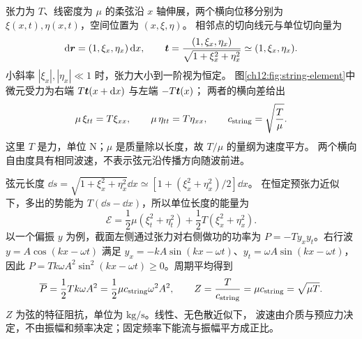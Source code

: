 张力为 $T$、线密度为 $\mu$ 的柔弦沿 $x$ 轴伸展，两个横向位移分别为
$\xi(x,t),\eta(x,t)$，空间位置为 $(x,\xi,\eta)$。
相邻点的切向线元与单位切向量为
\[
 \mathop{}\!\mathrm d\bm{r}=(1,\xi_x,\eta_x)\mathop{}\!\mathrm d x,\qquad
 \bm{t}=\frac{(1,\xi_x,\eta_x)}{\sqrt{1+\xi_x^2+\eta_x^2}}
 \simeq(1,\xi_x,\eta_x).
\]
小斜率 $|\xi_x|,|\eta_x|\ll1$ 时，张力大小到一阶视为恒定。
图\ref{ch12:fig:string-element}中微元受力为右端 $T\bm{t}(x+\mathop{}\!\mathrm d x)$ 与左端 $-T\bm{t}(x)$；
两者的横向差给出
\begin{equation}
 \mu\,\xi_{tt}=T\xi_{xx},\qquad
 \mu\,\eta_{tt}=T\eta_{xx},\qquad c_{\rm string}=\sqrt{\frac T\mu}.
 \label{ch12:eq:string-wave}
\end{equation}
这里 $T$ 是力，单位 $\mathrm N$；$\mu$ 是质量除以长度，故 $T/\mu$ 的量纲为速度平方。
两个横向自由度具有相同波速，不表示弦元沿传播方向随波前进。

\begin{center}\begin{minipage}{\linewidth}\centering
{}
\label{ch12:fig:string-element}
\end{minipage}\end{center}

弦元长度
$\dd s=\sqrt{1+\xi_x^2+\eta_x^2}\dd x
\simeq[1+(\xi_x^2+\eta_x^2)/2]\dd x$。
在恒定预张力近似下，多出的势能为 $T(\dd s-\dd x)$，所以单位长度的能量为
\begin{equation}
 \mathcal E=\frac12\mu(\xi_t^2+\eta_t^2)+\frac12T(\xi_x^2+\eta_x^2).
 \label{ch12:eq:string-energy}
\end{equation}
以一个偏振 $y$ 为例，截面左侧通过张力对右侧做功的功率为
$P=-Ty_xy_t$。右行波 $y=A\cos(kx-\omega t)$ 满足
$y_x=-kA\sin(kx-\omega t)$、$y_t=\omega A\sin(kx-\omega t)$，
因此 $P=Tk\omega A^2\sin^2(kx-\omega t)\ge0$。周期平均得到
\begin{equation}
 \overline P=\frac12Tk\omega A^2
 =\frac12\mu c_{\rm string}\omega^2A^2,\qquad
 Z=\frac T{c_{\rm string}}=\mu c_{\rm string}=\sqrt{\mu T}.
 \label{ch12:eq:string-power}
\end{equation}
$Z$ 为弦的特征阻抗，单位为 $\mathrm{kg/s}$。线性、无色散近似下，
波速由介质与预应力决定，不由振幅和频率决定；固定频率下能流与振幅平方成正比。

